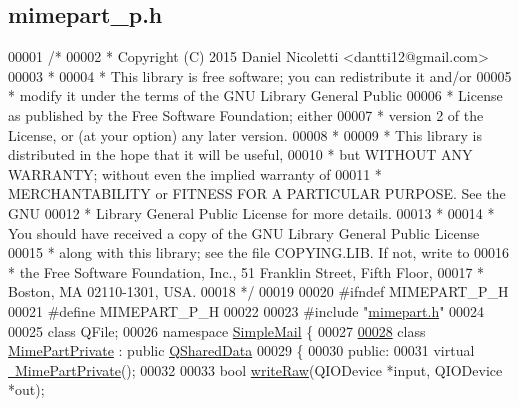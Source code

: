 \hypertarget{mimepart__p_8h_source}{}\subsection{mimepart\+\_\+p.\+h}
\label{mimepart__p_8h_source}

\begin{DoxyCode}
00001 \textcolor{comment}{/*}
00002 \textcolor{comment}{ * Copyright (C) 2015 Daniel Nicoletti <dantti12@gmail.com>}
00003 \textcolor{comment}{ *}
00004 \textcolor{comment}{ * This library is free software; you can redistribute it and/or}
00005 \textcolor{comment}{ * modify it under the terms of the GNU Library General Public}
00006 \textcolor{comment}{ * License as published by the Free Software Foundation; either}
00007 \textcolor{comment}{ * version 2 of the License, or (at your option) any later version.}
00008 \textcolor{comment}{ *}
00009 \textcolor{comment}{ * This library is distributed in the hope that it will be useful,}
00010 \textcolor{comment}{ * but WITHOUT ANY WARRANTY; without even the implied warranty of}
00011 \textcolor{comment}{ *  MERCHANTABILITY or FITNESS FOR A PARTICULAR PURPOSE. See the GNU}
00012 \textcolor{comment}{ * Library General Public License for more details.}
00013 \textcolor{comment}{ *}
00014 \textcolor{comment}{ * You should have received a copy of the GNU Library General Public License}
00015 \textcolor{comment}{ * along with this library; see the file COPYING.LIB. If not, write to}
00016 \textcolor{comment}{ * the Free Software Foundation, Inc., 51 Franklin Street, Fifth Floor,}
00017 \textcolor{comment}{ * Boston, MA 02110-1301, USA.}
00018 \textcolor{comment}{ */}
00019 
00020 \textcolor{preprocessor}{#ifndef MIMEPART\_P\_H}
00021 \textcolor{preprocessor}{#define MIMEPART\_P\_H}
00022 
00023 \textcolor{preprocessor}{#include "\hyperlink{mimepart_8h}{mimepart.h}"}
00024 
00025 \textcolor{keyword}{class }QFile;
00026 \textcolor{keyword}{namespace }\hyperlink{namespace_simple_mail}{SimpleMail} \{
00027 
\hyperlink{class_simple_mail_1_1_mime_part_private}{00028} \textcolor{keyword}{class }\hyperlink{class_simple_mail_1_1_mime_part_private}{MimePartPrivate} : \textcolor{keyword}{public} \hyperlink{class_q_shared_data}{QSharedData}
00029 \{
00030 \textcolor{keyword}{public}:
00031     \textcolor{keyword}{virtual} \hyperlink{class_simple_mail_1_1_mime_part_private_ad2003c3ac13e03f8abc76392cbba9e1d}{~MimePartPrivate}();
00032 
00033     \textcolor{keywordtype}{bool} \hyperlink{class_simple_mail_1_1_mime_part_private_a5409a7f49d4e02b3587ee7b679e62c35}{writeRaw}(QIODevice *input, QIODevice *out);

\end{DoxyCode}
